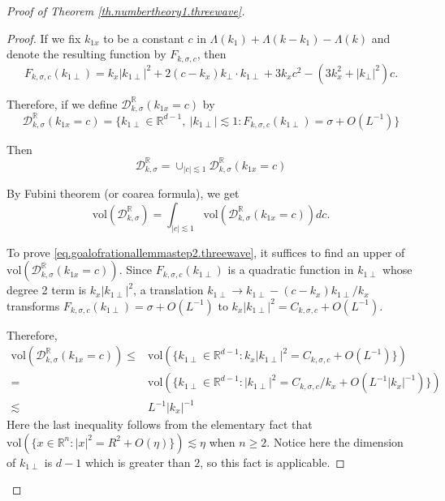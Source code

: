 \begin{proof}[Proof of Theorem \ref{th.numbertheory1.threewave}]
\begin{proof}
If we fix $k_{1x}$ to be a constant $c$ in $\Lambda(k_1)+\Lambda(k-k_1)-\Lambda(k)$ and denote the resulting function by $F_{k,\sigma, c}$, then 
\begin{equation}
    F_{k,\sigma, c}(k_{1\perp})=k_x|k_{1\perp}|^2+2(c-k_x)k_{\perp}\cdot k_{1\perp}+3k_x c^2-(3k_x^2+|k_{\perp}|^2)c.
\end{equation}

Therefore, if we define $\mathcal{D}^{\mathbb{R}}_{k,\sigma}(k_{1x}=c)$ by
\begin{equation}
\mathcal{D}^{\mathbb{R}}_{k,\sigma}(k_{1x}=c)=\{k_{1\perp}\in \mathbb{R}^{d-1},\ |k_{1\perp}|\lesssim 1:F_{k,\sigma, c}(k_{1\perp})=\sigma+O(L^{-1})\}
\end{equation}

Then 
\begin{equation}
    \mathcal{D}^{\mathbb{R}}_{k,\sigma}=\cup_{|c|\lesssim 1} \mathcal{D}^{\mathbb{R}}_{k,\sigma}(k_{1x}=c)
\end{equation}

By Fubini theorem (or coarea formula), we get
\begin{equation}\label{eq.rationallemmastep2'.threewave}
    \text{vol}(\mathcal{D}^{\mathbb{R}}_{k,\sigma})=\int_{|c|\lesssim 1} \text{vol}(\mathcal{D}^{\mathbb{R}}_{k,\sigma}(k_{1x}=c)) dc.
\end{equation}

To prove \eqref{eq.goalofrationallemmastep2.threewave}, it suffices to find an upper of $\text{vol}(\mathcal{D}^{\mathbb{R}}_{k,\sigma}(k_{1x}=c))$. Since $F_{k,\sigma, c}(k_{1\perp})$ is a quadratic function in $k_{1\perp}$ whose degree 2 term is $k_x|k_{1\perp}|^2$, a translation $k_{1\perp}\rightarrow k_{1\perp}-(c-k_x)k_{1\perp}/k_x$ transforms $F_{k,\sigma, c}(k_{1\perp})=\sigma+O(L^{-1})$ to $k_x|k_{1\perp}|^2=C_{k,\sigma,c}+O(L^{-1})$.

Therefore, 
\begin{equation}\label{eq.rationallemmastep2''.threewave}
\begin{split}
    \text{vol}(\mathcal{D}^{\mathbb{R}}_{k,\sigma}(k_{1x}=c))\le &\text{vol}(\{k_{1\perp}\in \mathbb{R}^{d-1}:k_x|k_{1\perp}|^2=C_{k,\sigma,c}+O(L^{-1})\})
    \\
    =& \text{vol}(\{k_{1\perp}\in \mathbb{R}^{d-1}:|k_{1\perp}|^2=C_{k,\sigma,c}/k_x+O(L^{-1}|k_x|^{-1})\})
    \\
    \lesssim& L^{-1}|k_x|^{-1}
\end{split}
\end{equation}
Here the last inequality follows from the elementary fact that $\text{vol}(\{x\in \mathbb{R}^n:|x|^2=R^2+O(\eta)\})\lesssim \eta$ when $n\ge 2$. Notice here the dimension of $k_{1\perp}$ is $d-1$ which is greater than $2$, so this fact is applicable.


\end{proof}
\end{proof}
